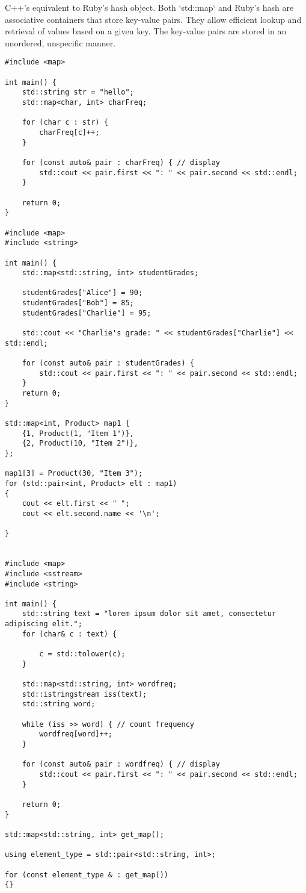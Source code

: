 \documentclass[openany]{report}
\begin{document}
C++'s equivalent to Ruby's hash object. 
Both `std::map` and Ruby's hash are associative containers that store key-value pairs.
They allow efficient lookup and retrieval of values based on a given key.
The key-value pairs are stored in an unordered, unspecific manner.

\begin{verbatim}
#include <map>

int main() {
    std::string str = "hello";
    std::map<char, int> charFreq;

    for (char c : str) {
        charFreq[c]++;
    }

    for (const auto& pair : charFreq) { // display
        std::cout << pair.first << ": " << pair.second << std::endl;
    }

    return 0;
}

#include <map>
#include <string>

int main() {
    std::map<std::string, int> studentGrades;

    studentGrades["Alice"] = 90;
    studentGrades["Bob"] = 85;
    studentGrades["Charlie"] = 95;

    std::cout << "Charlie's grade: " << studentGrades["Charlie"] << std::endl;

    for (const auto& pair : studentGrades) {
        std::cout << pair.first << ": " << pair.second << std::endl;
    }
    return 0;
}

std::map<int, Product> map1 {
    {1, Product(1, "Item 1")},
    {2, Product(10, "Item 2")},
};

map1[3] = Product(30, "Item 3");
for (std::pair<int, Product> elt : map1)
{
    cout << elt.first << " ";
    cout << elt.second.name << '\n';

}


#include <map>
#include <sstream>
#include <string>

int main() {
    std::string text = "lorem ipsum dolor sit amet, consectetur adipiscing elit.";
    for (char& c : text) {

        c = std::tolower(c);
    }

    std::map<std::string, int> wordfreq;
    std::istringstream iss(text);
    std::string word;

    while (iss >> word) { // count frequency
        wordfreq[word]++;
    }

    for (const auto& pair : wordfreq) { // display
        std::cout << pair.first << ": " << pair.second << std::endl;
    }

    return 0;
}

std::map<std::string, int> get_map();

using element_type = std::pair<std::string, int>;

for (const element_type & : get_map())
{}
\end{verbatim}
\end{document}
